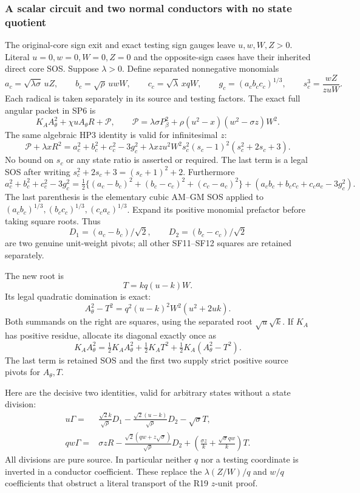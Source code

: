 \subsubsection*{A scalar circuit and two normal conductors with no state quotient}

The original-core sign exit and exact testing sign gauges leave
$u,w,W,Z>0$. Literal $u=0,w=0,W=0,Z=0$ and the opposite-sign
cases have their inherited direct core SOS. Suppose $\lambda>0$.
Define separated nonnegative monomials
\[
 a_c=\sqrt{\lambda\sigma}\,uZ,\qquad
 b_c=\sqrt\rho\,uwW,\qquad
 c_c=\sqrt\lambda\,xqW,\qquad
 g_c=(a_cb_cc_c)^{1/3},\qquad
 s_c^3=\frac{wZ}{zuW}.
 \tag{SF10}
\]
Each radical is taken separately in its source and testing factors.
The exact full angular packet in SP6 is
\[
 K_AA_\theta^2+\chi uA_\theta R+\mathscr P,
 \qquad
 \mathscr P=\lambda\sigma P_\beta^2
       +\rho(u^2-x)(w^2-\sigma z)W^2.
\]
The same algebraic HP3 identity is valid for infinitesimal $z$:
\[
 \mathscr P+\lambda xR^2
 =a_c^2+b_c^2+c_c^2-3g_c^2
   +\lambda xzu^2W^2s_c^2(s_c-1)^2(s_c^2+2s_c+3).
 \tag{SF11}
\]
No bound on $s_c$ or any state ratio is asserted or required. The last
term is a legal SOS after writing $s_c^2+2s_c+3=(s_c+1)^2+2$.
Furthermore
\[
 a_c^2+b_c^2+c_c^2-3g_c^2
 =\tfrac12\{(a_c-b_c)^2+(b_c-c_c)^2+(c_c-a_c)^2\}
      +(a_cb_c+b_cc_c+c_ca_c-3g_c^2).
 \tag{SF12}
\]
The last parenthesis is the elementary cubic AM--GM SOS applied to
$(a_cb_c)^{1/3},(b_cc_c)^{1/3},(c_ca_c)^{1/3}$. Expand its
positive monomial prefactor before taking square roots. Thus
\[
 D_1=(a_c-b_c)/\sqrt2,\qquad
 D_2=(b_c-c_c)/\sqrt2
\]
are two genuine unit-weight pivots; all other SF11--SF12 squares
are retained separately.

The new root is
\[
 T=kq(u-k)W.
\]
Its legal quadratic domination is exact:
\[
 A_\theta^2-T^2=q^2(u-k)^2W^2(u^2+2uk).
 \tag{SF13}
\]
Both summands on the right are squares, using the separated root
$\sqrt u\sqrt k$. If $K_A$ has positive residue, allocate its
diagonal exactly once as
\[
 K_AA_\theta^2=\tfrac12K_AA_\theta^2+\tfrac12K_AT^2
                        +\tfrac12K_A(A_\theta^2-T^2).
 \tag{SF14}
\]
The last term is retained SOS and the first two supply strict
positive source pivots for $A_\theta,T$.

Here are the decisive two identities, valid for arbitrary states
without a state division:
\[
 \boxed{\begin{aligned}
 u\Gamma={}&\frac{\sqrt2 k}{\sqrt\rho}D_1
       -\frac{\sqrt2(u-k)}{\sqrt\rho}D_2-\sqrt\sigma T,\\
 qw\Gamma={}&\sigma zR
       -\frac{\sqrt2(qw+z\sqrt\sigma)}{\sqrt\rho}D_2
       +\left(\frac{\sigma z}{k}
                  +\frac{\sqrt\sigma qw}{k}\right)T.
 \end{aligned}}
 \tag{SF15}
\]
All divisions are pure source. In particular neither $q$ nor a
testing coordinate is inverted in a conductor coefficient. These
replace the $\lambda(Z/W)/q$ and $w/q$ coefficients that obstruct a
literal transport of the R19 $z$-unit proof.

